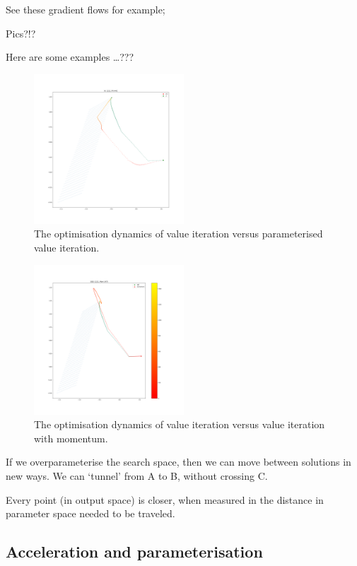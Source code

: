See these gradient flows for example;

Pics?!?

Here are some examples \ldots{}???

\begin{figure}
\centering
\includegraphics[width=0.5\textwidth,height=0.5\textheight]{../../pictures/figures/vi-vs-pvi.png}
\caption{The optimisation dynamics of value iteration versus parameterised value iteration.}
\end{figure}

\begin{figure}
\centering
\includegraphics[width=0.5\textwidth,height=0.5\textheight]{../../pictures/figures/vi_sgd-vs-vi_mom.png}
\caption{The optimisation dynamics of value iteration versus value iteration with momentum.}
\end{figure}

If we overparameterise the search space, then we can move between solutions in new ways. We can `tunnel' from A to B, without crossing C.

Every point (in output space) is closer, when measured in the distance in parameter space needed to be traveled.


\subsection{Acceleration and parameterisation}

